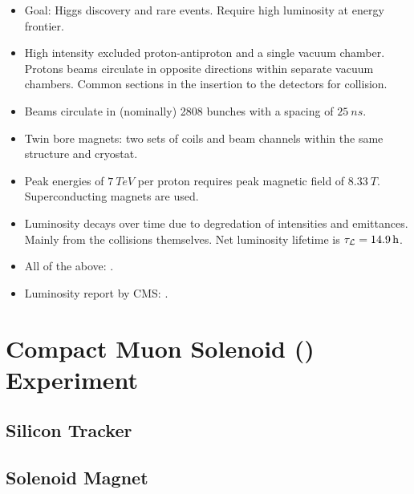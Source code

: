 \begin{itemize}
    \item Goal: Higgs discovery and rare events. Require high luminosity at
        energy frontier.
    \item High intensity excluded proton-antiproton and a single vacuum chamber.
        Protons beams circulate in opposite directions within separate vacuum
        chambers. Common sections in the insertion to the detectors for
        collision.
    \item Beams circulate in (nominally) 2808 bunches with a spacing of
        ${\SI{25}{ns}}$.
    \item Twin bore magnets: two sets of coils and beam channels within the same
        structure and cryostat.
    \item Peak energies of ${\SI{7}{TeV}}$ per proton requires peak magnetic
        field of ${\SI{8.33}{T}}$. Superconducting magnets are used.
    \item Luminosity decays over time due to degredation of intensities and
        emittances. Mainly from the collisions themselves. Net luminosity
        lifetime is ${\tau_{\mathcal{L}} = \SI{14.9}{h}}$.
    \item All of the above: \cite{Bruning:782076}.
    \item Luminosity report by CMS: \cite{CMS-PAS-LUM-17-001}.
\end{itemize}

\section{Compact Muon Solenoid (\CMS) Experiment}

\subsection{Silicon Tracker}

\subsection{\ECAL}

\subsection{\HCAL}

\subsection{Solenoid Magnet}

